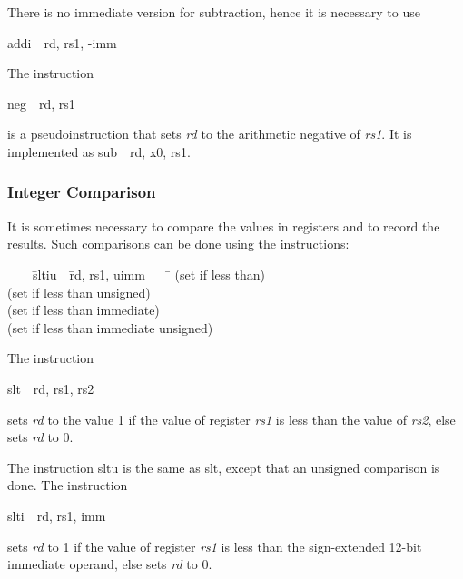 \documentclass[11pt, twoside, pdftex]{article}
\newenvironment{ctabbing}%
{\begin{center}\begin{minipage}{\textwidth}\begin{tabbing}}
{\end{tabbing}\end{minipage}\end{center}}
\begin{document}
\noindent
There is no immediate version for subtraction, hence it is necessary to use 
\begin{center}
{\sf addi~~rd, rs1, -imm}
\end{center}
\vspace{-\baselineskip}
\noindent
The instruction
\vspace{-\baselineskip}
\begin{center}
{\sf neg~~rd, rs1}
\end{center}
\noindent
is a pseudoinstruction that sets {\it rd} to the arithmetic negative of {\it rs1}. It is
implemented as {\sf sub~~rd, x0, rs1}.

\subsubsection{Integer Comparison}
\label{sec:compare}

It is sometimes necessary to compare the values in registers and to record the results.
Such comparisons can be done using the instructions: 
\vspace{-\baselineskip}
\begin{ctabbing}
~~~~\={\sf sltiu}~~\={\sf rd, rs1, uimm}~~~~\=\kill
{}  \>(set if less than)\\
  \>(set if less than unsigned)\\
  \>(set if less than immediate)\\
  \>(set if less than immediate unsigned)
\end{ctabbing}

\noindent
The instruction
\vspace{-\baselineskip}
\begin{center}
{\sf slt~~rd, rs1, rs2}
\end{center}
\noindent
sets {\it rd} to the value 1 if the value of register {\it rs1} is less than the
value of {\it rs2}, else sets {\it rd} to 0.

The instruction {\sf sltu} is the same as {\sf slt}, except that an unsigned comparison is done. 
\newpage
\noindent
The instruction
\vspace{-\baselineskip}
\begin{center}
{\sf slti~~rd, rs1, imm}
\end{center}
\noindent
sets {\it rd} to 1 if the value of register {\it rs1} is less than the sign-extended 12-bit
immediate operand, else sets {\it rd} to 0.
\end{document}
